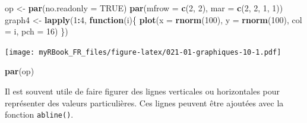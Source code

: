 \documentclass[
]{book}
\newenvironment{Shaded}{\begin{snugshade}}{\end{snugshade}}
\newcommand{\ControlFlowTok}[1]{\textcolor[rgb]{0.13,0.29,0.53}{\textbf{#1}}}
\newcommand{\DataTypeTok}[1]{\textcolor[rgb]{0.13,0.29,0.53}{#1}}
\newcommand{\DecValTok}[1]{\textcolor[rgb]{0.00,0.00,0.81}{#1}}
\newcommand{\KeywordTok}[1]{\textcolor[rgb]{0.13,0.29,0.53}{\textbf{#1}}}
\newcommand{\NormalTok}[1]{#1}
\newcommand{\OperatorTok}[1]{\textcolor[rgb]{0.81,0.36,0.00}{\textbf{#1}}}
\newcommand{\OtherTok}[1]{\textcolor[rgb]{0.56,0.35,0.01}{#1}}
\newcommand{\StringTok}[1]{\textcolor[rgb]{0.31,0.60,0.02}{#1}}
\begin{document}
\begin{Shaded}
\begin{Highlighting}[]
\NormalTok{op <-}\StringTok{ }\KeywordTok{par}\NormalTok{(}\DataTypeTok{no.readonly =} \OtherTok{TRUE}\NormalTok{)}
\KeywordTok{par}\NormalTok{(}\DataTypeTok{mfrow =} \KeywordTok{c}\NormalTok{(}\DecValTok{2}\NormalTok{, }\DecValTok{2}\NormalTok{), }\DataTypeTok{mar =} \KeywordTok{c}\NormalTok{(}\DecValTok{2}\NormalTok{, }\DecValTok{2}\NormalTok{, }\DecValTok{1}\NormalTok{, }\DecValTok{1}\NormalTok{))}
\NormalTok{graph4 <-}\StringTok{ }\KeywordTok{lapply}\NormalTok{(}\DecValTok{1}\OperatorTok{:}\DecValTok{4}\NormalTok{, }\ControlFlowTok{function}\NormalTok{(i)\{}
  \KeywordTok{plot}\NormalTok{(}\DataTypeTok{x =} \KeywordTok{rnorm}\NormalTok{(}\DecValTok{100}\NormalTok{), }
    \DataTypeTok{y =} \KeywordTok{rnorm}\NormalTok{(}\DecValTok{100}\NormalTok{), }
    \DataTypeTok{col =}\NormalTok{ i, }\DataTypeTok{pch =} \DecValTok{16}\NormalTok{)}
\NormalTok{\})}
\end{Highlighting}
\end{Shaded}

\texttt{[image: myRBook\_FR\_files/figure-latex/021-01-graphiques-10-1.pdf]}

\begin{Shaded}
\begin{Highlighting}[]
\KeywordTok{par}\NormalTok{(op)}
\end{Highlighting}
\end{Shaded}

Il est souvent utile de faire figurer des lignes verticales ou horizontales pour représenter des valeurs particulières. Ces lignes peuvent être ajoutées avec la fonction \texttt{abline()}.
\end{document}
